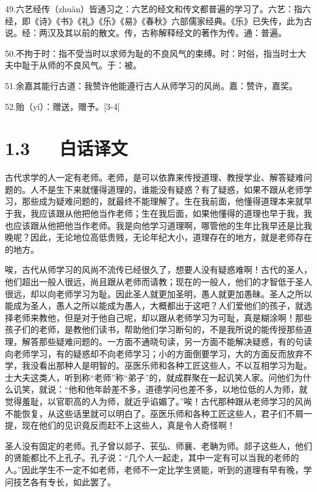 \documentclass[letterpaper,10pt,english]{sphinxmanual}
\begin{document}
49.六艺经传（zhuàn）皆通习之：六艺的经文和传文都普遍的学习了。六艺：指六经，即《诗》《书》《礼》《乐》《易》《春秋》六部儒家经典。《乐》已失传，此为古说。经：两汉及其以前的散文。传，古称解释经文的著作为传。通：普遍。

50.不拘于时：指不受当时以求师为耻的不良风气的束缚。时：时俗，指当时士大夫中耻于从师的不良风气。于：被。

51.余嘉其能行古道：我赞许他能遵行古人从师学习的风尚。嘉：赞许，嘉奖。

52.贻（yí）：赠送，赠予。{[}3-4{]}


\section{1.3   白话译文}
\label{\detokenize{p01_u6563_u6587/_u97e9_u6108-_u5e08_u8bf4:id5}}
古代求学的人一定有老师。老师，是可以依靠来传授道理、教授学业、解答疑难问题的。人不是生下来就懂得道理的，谁能没有疑惑？有了疑惑，如果不跟从老师学习，那些成为疑难问题的，就最终不能理解了。生在我前面，他懂得道理本来就早于我，我应该跟从他把他当作老师；生在我后面，如果他懂得的道理也早于我，我也应该跟从他把他当作老师。我是向他学习道理啊，哪管他的生年比我早还是比我晚呢？因此，无论地位高低贵贱，无论年纪大小，道理存在的地方，就是老师存在的地方。

唉，古代从师学习的风尚不流传已经很久了，想要人没有疑惑难啊！古代的圣人，他们超出一般人很远，尚且跟从老师而请教；现在的一般人，他们的才智低于圣人很远，却以向老师学习为耻。因此圣人就更加圣明，愚人就更加愚昧。圣人之所以能成为圣人，愚人之所以能成为愚人，大概都出于这吧？人们爱他们的孩子，就选择老师来教他，但是对于他自己呢，却以跟从老师学习为可耻，真是糊涂啊！那些孩子们的老师，是教他们读书，帮助他们学习断句的，不是我所说的能传授那些道理，解答那些疑难问题的。一方面不通晓句读，另一方面不能解决疑惑，有的句读向老师学习，有的疑惑却不向老师学习；小的方面倒要学习，大的方面反而放弃不学，我没看出那种人是明智的。巫医乐师和各种工匠这些人，不以互相学习为耻。士大夫这类人，听到称“老师”称“弟子”的，就成群聚在一起讥笑人家。问他们为什么讥笑，就说：“他和他年龄差不多，道德学问也差不多，以地位低的人为师，就觉得羞耻，以官职高的人为师，就近乎谄媚了。”唉！古代那种跟从老师学习的风尚不能恢复，从这些话里就可以明白了。巫医乐师和各种工匠这些人，君子们不屑一提，现在他们的见识竟反而赶不上这些人，真是令人奇怪啊！

圣人没有固定的老师。孔子曾以郯子、苌弘、师襄、老聃为师。郯子这些人，他们的贤能都比不上孔子。孔子说：“几个人一起走，其中一定有可以当我的老师的人。”因此学生不一定不如老师，老师不一定比学生贤能，听到的道理有早有晚，学问技艺各有专长，如此罢了。
\end{document}

